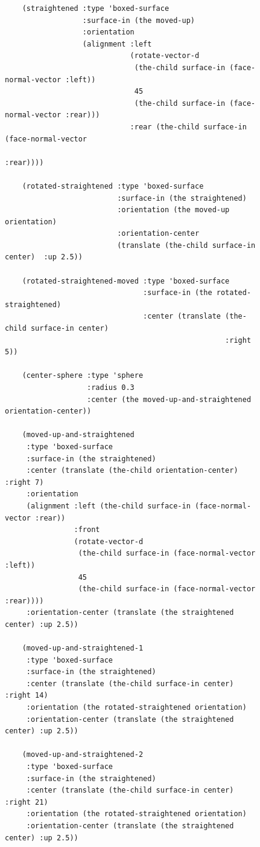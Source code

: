 \documentclass [11pt]{book}
\begin{document}
\begin{itemize}
\begin{figure}
\begin{lrbox}{\boxedverb}
\begin{minipage}{\linewidth}
{\begin{verbatim}
    (straightened :type 'boxed-surface
                  :surface-in (the moved-up)
                  :orientation 
                  (alignment :left 
                             (rotate-vector-d 
                              (the-child surface-in (face-normal-vector :left))
                              45
                              (the-child surface-in (face-normal-vector :rear)))
                             :rear (the-child surface-in (face-normal-vector 
                                                          :rear))))

    (rotated-straightened :type 'boxed-surface
                          :surface-in (the straightened)
                          :orientation (the moved-up orientation)
                          :orientation-center 
                          (translate (the-child surface-in center)  :up 2.5))
  
    (rotated-straightened-moved :type 'boxed-surface
                                :surface-in (the rotated-straightened)
                                :center (translate (the-child surface-in center)
                                                   :right 5))

    (center-sphere :type 'sphere 
                   :radius 0.3 
                   :center (the moved-up-and-straightened orientation-center))
      
    (moved-up-and-straightened 
     :type 'boxed-surface
     :surface-in (the straightened)
     :center (translate (the-child orientation-center) :right 7)
     :orientation 
     (alignment :left (the-child surface-in (face-normal-vector :rear))
                :front
                (rotate-vector-d 
                 (the-child surface-in (face-normal-vector :left))
                 45
                 (the-child surface-in (face-normal-vector :rear))))
     :orientation-center (translate (the straightened center) :up 2.5))
 
    (moved-up-and-straightened-1
     :type 'boxed-surface
     :surface-in (the straightened)
     :center (translate (the-child surface-in center) :right 14)
     :orientation (the rotated-straightened orientation)
     :orientation-center (translate (the straightened center) :up 2.5))
    
    (moved-up-and-straightened-2 
     :type 'boxed-surface
     :surface-in (the straightened)
     :center (translate (the-child surface-in center) :right 21)
     :orientation (the rotated-straightened orientation)
     :orientation-center (translate (the straightened center) :up 2.5))
    

\end{verbatim}}
\end{minipage}
\end{lrbox}
\end{figure}
\end{itemize}
\end{document}
